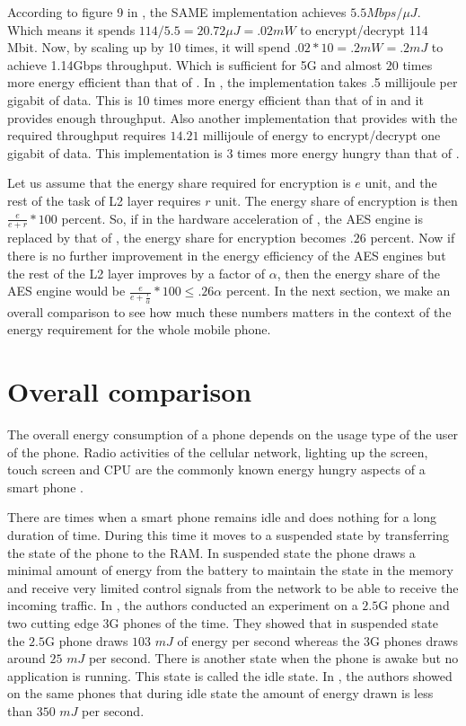 According to figure 9 in \cite{Ruhr_2011}, the SAME implementation achieves $5.5Mbps/ \mu J$. Which means it spends $114/5.5 = 20.72\mu J = .02 mW$ to encrypt/decrypt 114 Mbit. Now, by scaling up by 10 times, it will spend $.02*10=.2mW = .2mJ$ to achieve 1.14Gbps throughput. Which is sufficient for 5G and almost $20$ times more energy efficient than that of \cite{IIS_Ruhr_2010}. In \cite{Ruhr_2009}, the implementation takes .5 millijoule per gigabit of data. This is 10 times more energy efficient than that of in \cite{IIS_Ruhr_2010} and it provides enough throughput. Also another implementation that provides with the required throughput requires $14.21$ millijoule of energy to encrypt/decrypt one gigabit of data. This implementation is $3$ times more energy hungry than that of \cite{Ruhr_2009}. 

Let us assume that the energy share required for encryption is $e$ unit, and the rest of the task of L2 layer requires $r$ unit. The energy share of encryption is then $\frac{e}{e+r}*100$ percent. So, if in the hardware acceleration of \cite{IIS_Ruhr_2010}, the AES engine is replaced by that of \cite{Ruhr_2011}, the energy share for encryption becomes $.26$ percent. Now if there is no further improvement in the energy efficiency of the AES engines but the rest of the L2 layer improves by a factor of $\alpha$, then the energy share of the AES engine would be $\frac{e}{e+\frac{r}{\alpha}}*100 \leq .26 \alpha$ percent. In the next section, we make an overall comparison to see how much these numbers matters in the context of the energy requirement for the whole mobile phone.

\section{Overall comparison}
The overall energy consumption of a phone depends on the usage type of the user of the phone. Radio activities of the cellular network, lighting up the screen, touch screen and CPU are the commonly known energy hungry aspects of a smart phone \cite{Usenix_2010}. 

There are times when a smart phone remains idle and does nothing for a long duration of time. During this time it moves to a suspended state by transferring the state of the phone to the RAM. In suspended state the phone draws a minimal amount of energy from the battery to maintain the state in the memory and receive very limited control signals from the network to be able to receive the incoming traffic. In \cite{Usenix_2010}, the authors conducted an experiment on a $2.5$G phone and two cutting edge $3$G phones of the time. They showed that in suspended state the $2.5$G phone draws $103$ $mJ$ of energy per second whereas the 3G phones draws around $25$ $mJ$ per second. There is another state when the phone is awake but no application is running. This state is called the idle state. In \cite{Usenix_2010}, the authors showed on the same phones that during idle state the amount of energy drawn is less than $350$ $mJ$ per second. 

